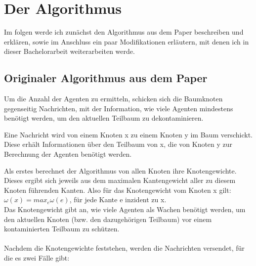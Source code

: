 \section{Der Algorithmus}
Im folgen werde ich zunächst den Algorithmus aus dem Paper beschreiben und erklären, sowie im Anschluss ein paar Modifikationen erläutern, mit denen ich in dieser Bachelorarbeit weiterarbeiten werde.



\subsection{Originaler Algorithmus aus dem Paper}\label{paperAlgoChapter}
Um die Anzahl der Agenten zu ermitteln, schicken sich die Baumknoten gegenseitig Nachrichten, mit der Information, wie viele Agenten mindestens benötigt werden, um den aktuellen Teilbaum zu dekontaminieren.

\begin{mydef}
	Eine Nachricht wird von einem Knoten x zu einem Knoten y im Baum verschickt. Diese erhält Informationen über den Teilbaum von x, die von Knoten y zur Berechnung der Agenten benötigt werden.
\end{mydef}

Als erstes berechnet der Algorithmus von allen Knoten ihre Knotengewichte. Dieses ergibt sich jeweils aus dem maximalen Kantengewicht aller zu diesem Knoten führenden Kanten. Also für das Knotengewicht vom Knoten x gilt: $\omega(x) = max_{e} \omega(e)$, für jede Kante e inzident zu x.
\\
Das Knotengewicht gibt an, wie viele Agenten als Wachen benötigt werden, um den aktuellen Knoten (bzw. den dazugehörigen Teilbaum) vor einem kontaminierten Teilbaum zu schützen.
\\
\\
Nachdem die Knotengewichte feststehen, werden die Nachrichten versendet, für die es zwei Fälle gibt:

